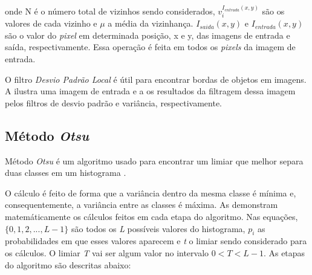 \noindent onde N é o número total de vizinhos sendo considerados, $v_{i}^{I_{entrada}(x,y)}$ são os valores de cada vizinho e $\mu$ a média da vizinhança. $I_{saida}(x,y)$ e $I_{entrada}(x,y)$ são o valor do \textit{pixel} em determinada posição, x e y, das imagens de entrada e saída, respectivamente. Essa operação é feita em todos os \textit{pixels} da imagem de entrada.

\par O filtro \textit{Desvio Padrão Local} é útil para encontrar bordas de objetos em imagens. A  ilustra uma imagem de entrada e a  os resultados da filtragem dessa imagem pelos filtros de desvio padrão e variância, respectivamente.





\FloatBarrier

\subsection{Método \textit{Otsu}}\label{sec:dom_esp:otsu}

\par Método \textit{Otsu} é um algoritmo usado para encontrar um limiar que melhor separa duas classes em um histograma \cite{otsumethod}.

\par O cálculo é feito de forma que a variância dentro da mesma classe é mínima e, consequentemente, a variância entre as classes é máxima. As  demonstram matemáticamente os cálculos feitos em cada etapa do algoritmo. Nas equações, $\{0, 1, 2, ..., L - 1\}$ são todos os \textit{L} possíveis valores do histograma, $p_{i}$ as probabilidades em que esses valores aparecem e \textit{t} o limiar sendo considerado para os cálculos. O limiar \textit{T} vai ser algum valor no intervalo $0 < T < L - 1$. As etapas do algoritmo são descritas abaixo:

